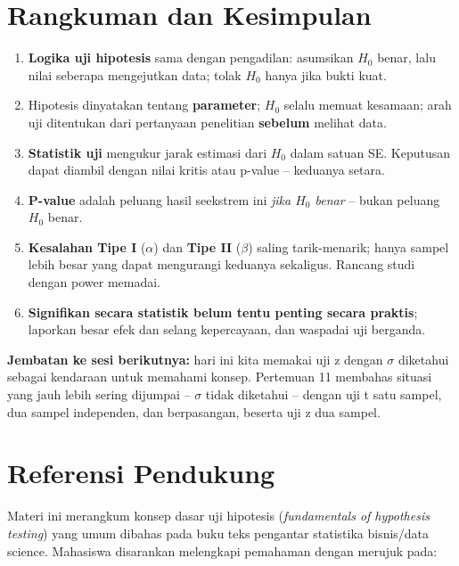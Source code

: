 \documentclass[
  indonesian,
  letterpaper,
]{book}
\providecommand{\tightlist}{%
  \setlength{\itemsep}{0pt}\setlength{\parskip}{0pt}}
\begin{document}
\section{Rangkuman dan Kesimpulan}\label{rangkuman-dan-kesimpulan-1}

\begin{enumerate}
\def\labelenumi{\arabic{enumi}.}
\tightlist
\item
  \textbf{Logika uji hipotesis} sama dengan pengadilan: asumsikan
  \(H_0\) benar, lalu nilai seberapa mengejutkan data; tolak \(H_0\)
  hanya jika bukti kuat.
\item
  Hipotesis dinyatakan tentang \textbf{parameter}; \(H_0\) selalu memuat
  kesamaan; arah uji ditentukan dari pertanyaan penelitian
  \textbf{sebelum} melihat data.
\item
  \textbf{Statistik uji} mengukur jarak estimasi dari \(H_0\) dalam
  satuan SE. Keputusan dapat diambil dengan nilai kritis atau p-value --
  keduanya setara.
\item
  \textbf{P-value} adalah peluang hasil seekstrem ini \emph{jika \(H_0\)
  benar} -- bukan peluang \(H_0\) benar.
\item
  \textbf{Kesalahan Tipe I} (\(\alpha\)) dan \textbf{Tipe II}
  (\(\beta\)) saling tarik-menarik; hanya sampel lebih besar yang dapat
  mengurangi keduanya sekaligus. Rancang studi dengan power memadai.
\item
  \textbf{Signifikan secara statistik belum tentu penting secara
  praktis}; laporkan besar efek dan selang kepercayaan, dan waspadai uji
  berganda.
\end{enumerate}

\textbf{Jembatan ke sesi berikutnya:} hari ini kita memakai uji z dengan
\(\sigma\) diketahui sebagai kendaraan untuk memahami konsep. Pertemuan
11 membahas situasi yang jauh lebih sering dijumpai -- \(\sigma\) tidak
diketahui -- dengan uji t satu sampel, dua sampel independen, dan
berpasangan, beserta uji z dua sampel.

\section{Referensi Pendukung}\label{referensi-pendukung-1}

Materi ini merangkum konsep dasar uji hipotesis (\emph{fundamentals of
hypothesis testing}) yang umum dibahas pada buku teks pengantar
statistika bisnis/data science. Mahasiswa disarankan melengkapi
pemahaman dengan merujuk pada:
\end{document}
